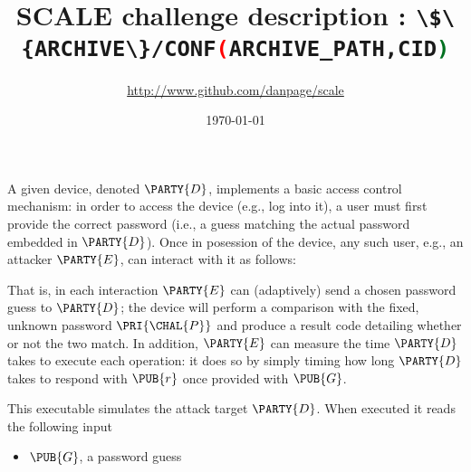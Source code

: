 \documentclass[crop={false},multi={true},tikz={true}]{standalone}
\begin{document}

\ifstandalone
\author{\url{http://www.github.com/danpage/scale}}
\title{\Large SCALE challenge description : \lstinline[language={bash}]|\$\{ARCHIVE\}/CONF(ARCHIVE_PATH,CID)|}
\date{\today}

\maketitle
\fi



A given device, denoted $\PARTY{D}$, 
implements a basic access control mechanism: in order to access the device
(e.g., log into it), a user must first provide the correct password (i.e., 
a guess matching the actual password embedded in $\PARTY{D}$).  
Once in posession of the device, any such user, e.g., 
an attacker $\PARTY{E}$, can interact with it as follows:

\begin{center}

\end{center}

\noindent
That is, in each interaction $\PARTY{E}$ can (adaptively) send 
a chosen password guess
to $\PARTY{D}$; the device will
perform a comparison with the fixed, unknown password $\PRI{\CHAL{P}}$ 
and produce 
a result code detailing whether or not the two match.
In addition, $\PARTY{E}$ can measure the time $\PARTY{D}$ takes to execute 
each operation: it does so
by simply timing how long $\PARTY{D}$ takes to respond with $\PUB{r}$ once
provided with $\PUB{G}$.



This executable simulates the attack target $\PARTY{D}$.  When executed it 
reads the following input

\begin{itemize}
\item $\PUB{G}$,
      a  password guess
\end{itemize}
\end{document}
